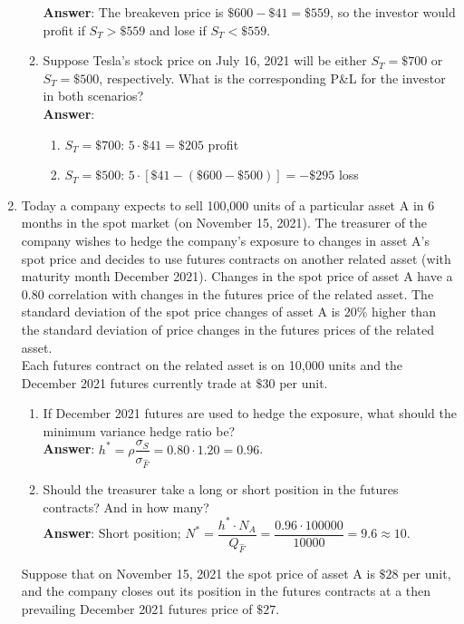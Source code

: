 \documentclass{article}
\begin{document}
\begin{enumerate}
\begin{enumerate}
                        \textbf{Answer}: The breakeven price is $\$600-\$41=\$559$, so the investor would profit if $S_T>\$559$ and lose if $S_T<\$559$.
                  \item Suppose Tesla's stock price on July 16, 2021 will be either $S_T=\$700$ or $S_T=\$500$, respectively. What is the corresponding P\&L for the investor in both scenarios?\\
                        \textbf{Answer}:
                        \begin{enumerate}
                              \item $S_T=\$700$: $5\cdot\$41=\$205$ profit
                              \item $S_T=\$500$: $5\cdot[\$41-(\$600-\$500)]=-\$295$ loss
                        \end{enumerate}
            \end{enumerate}
            \newpage
      \item Today a company expects to sell 100,000 units of a particular asset A in 6 months in the spot market (on November 15, 2021). The treasurer of the company wishes to hedge the company's exposure to changes in asset A's spot price and decides to use futures contracts on another related asset (with maturity month December 2021). Changes in the spot price of asset A have a 0.80 correlation with changes in the futures price of the related asset. The standard deviation of the spot price changes of asset A is $20\%$ higher than the standard deviation of price changes in the futures prices of the related asset.\\Each futures contract on the related asset is on 10,000 units and the December 2021 futures currently trade at $\$30$ per unit.
            \begin{enumerate}
                  \item If December 2021 futures are used to hedge the exposure, what should the minimum variance hedge ratio be?\\
                        \textbf{Answer}: $h^*=\rho\dfrac{\sigma_S}{\sigma_{\hat{F}}}=0.80\cdot 1.20=0.96$.
                  \item Should the treasurer take a long or short position in the futures contracts? And in how many?\\
                        \textbf{Answer}: Short position; $N^*=\dfrac{h^*\cdot N_A}{Q_{\hat{F}}}=\dfrac{0.96\cdot 100000}{10000}=9.6\approx 10$.
            \end{enumerate}
            Suppose that on November 15, 2021 the spot price of asset A is $\$28$ per unit, and the company closes out its position in the futures contracts at a then prevailing December 2021 futures price of $\$27$.

\end{enumerate}
\end{document}
